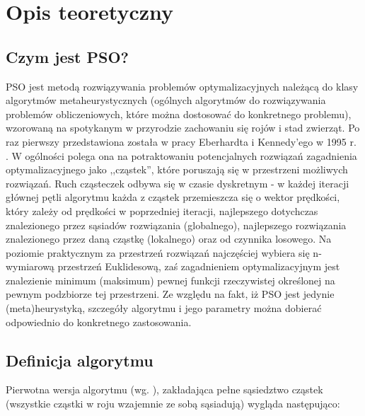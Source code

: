 \documentclass[12pt, twoside, openany, abstract=on]{report}
\theoremstyle{definition}
\begin{document}

\chapter{Opis teoretyczny} %

\section{Czym jest PSO?} %

PSO jest metodą rozwiązywania problemów optymalizacyjnych należącą do klasy algorytmów metaheurystycznych (ogólnych algorytmów do rozwiązywania problemów obliczeniowych, które można dostosować do konkretnego problemu), wzorowaną na spotykanym w przyrodzie zachowaniu się rojów i stad zwierząt. Po raz pierwszy przedstawiona została w pracy Eberhardta  i Kennedy’ego w 1995 r. \cite{Pso}. W ogólności polega ona na potraktowaniu potencjalnych rozwiązań zagadnienia optymalizacyjnego jako ,,cząstek'', które poruszają się w przestrzeni możliwych rozwiązań. Ruch cząsteczek odbywa się w czasie dyskretnym - w każdej iteracji głównej pętli algorytmu każda z cząstek przemieszcza się o wektor prędkości, który zależy od prędkości w poprzedniej iteracji, najlepszego dotychczas znalezionego przez sąsiadów rozwiązania (globalnego), najlepszego rozwiązania znalezionego przez daną cząstkę (lokalnego) oraz od czynnika losowego. Na poziomie praktycznym za przestrzeń rozwiązań najczęściej wybiera się n-wymiarową przestrzeń Euklidesową, zaś zagadnieniem optymalizacyjnym jest znalezienie minimum (maksimum) pewnej funkcji rzeczywistej określonej na pewnym podzbiorze tej przestrzeni. Ze względu na fakt, iż PSO jest jedynie (meta)heurystyką, szczegóły algorytmu i jego parametry można dobierać odpowiednio do konkretnego zastosowania.


\section{Definicja algorytmu} %

 
Pierwotna wersja algorytmu (wg. \cite{Pso}), zakładająca pełne sąsiedztwo cząstek (wszystkie cząstki w roju wzajemnie ze sobą sąsiadują) wygląda następująco:
\end{document}
